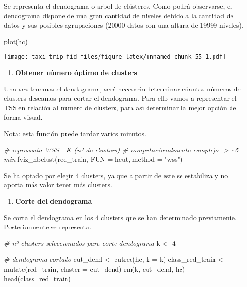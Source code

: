 \documentclass[
]{article}
\newenvironment{Shaded}{\begin{snugshade}}{\end{snugshade}}
\newcommand{\AttributeTok}[1]{\textcolor[rgb]{0.77,0.63,0.00}{#1}}
\newcommand{\CommentTok}[1]{\textcolor[rgb]{0.56,0.35,0.01}{\textit{#1}}}
\newcommand{\DecValTok}[1]{\textcolor[rgb]{0.00,0.00,0.81}{#1}}
\newcommand{\FunctionTok}[1]{\textcolor[rgb]{0.00,0.00,0.00}{#1}}
\newcommand{\NormalTok}[1]{#1}
\newcommand{\OtherTok}[1]{\textcolor[rgb]{0.56,0.35,0.01}{#1}}
\newcommand{\StringTok}[1]{\textcolor[rgb]{0.31,0.60,0.02}{#1}}
\providecommand{\tightlist}{%
  \setlength{\itemsep}{0pt}\setlength{\parskip}{0pt}}
\begin{document}
Se representa el dendograma o árbol de clústeres. Como podrá observarse,
el dendograma dispone de una gran cantidad de niveles debido a la
cantidad de datos y sus posibles agrupaciones (20000 datos con una
altura de 19999 niveles).

\begin{Shaded}
\begin{Highlighting}[]
\FunctionTok{plot}\NormalTok{(hc)}
\end{Highlighting}
\end{Shaded}

\texttt{[image: taxi\_trip\_fid\_files/figure-latex/unnamed-chunk-55-1.pdf]}

\begin{enumerate}
\def\labelenumi{\arabic{enumi}.}
\setcounter{enumi}{3}
\tightlist
\item
  \textbf{Obtener número óptimo de clusters}
\end{enumerate}

Una vez tenemos el dendograma, será necesario determinar cúantos números
de clusters deseamos para cortar el dendograma. Para ello vamos a
representar el TSS en relación al número de clusters, para así
determinar la mejor opción de forma visual.

Nota: esta función puede tardar varios minutos.

\begin{Shaded}
\begin{Highlighting}[]
\CommentTok{\# representa WSS {-} K (nº de clusters)}
\CommentTok{\# computacionalmente complejo {-}\textgreater{} \textasciitilde{}5 min}
\FunctionTok{fviz\_nbclust}\NormalTok{(red\_train, }\AttributeTok{FUN =}\NormalTok{ hcut, }\AttributeTok{method =} \StringTok{"wss"}\NormalTok{)}
\end{Highlighting}
\end{Shaded}

Se ha optado por elegir 4 clusters, ya que a partir de este se
estabiliza y no aporta más valor tener más clusters.

\begin{enumerate}
\def\labelenumi{\arabic{enumi}.}
\setcounter{enumi}{4}
\tightlist
\item
  \textbf{Corte del dendograma}
\end{enumerate}

Se corta el dendograma en los 4 clusters que se han determinado
previamente. Posteriormente se representa.

\begin{Shaded}
\begin{Highlighting}[]
\CommentTok{\# nº clusters seleccionados para corte dendograma}
\NormalTok{k }\OtherTok{\textless{}{-}} \DecValTok{4}

\CommentTok{\# dendograma cortado}
\NormalTok{cut\_dend }\OtherTok{\textless{}{-}} \FunctionTok{cutree}\NormalTok{(hc, }\AttributeTok{k =}\NormalTok{ k)}
\NormalTok{class\_red\_train }\OtherTok{\textless{}{-}} \FunctionTok{mutate}\NormalTok{(red\_train, }\AttributeTok{cluster =}\NormalTok{ cut\_dend)}
\FunctionTok{rm}\NormalTok{(k, cut\_dend, hc)}
\FunctionTok{head}\NormalTok{(class\_red\_train)}
\end{Highlighting}
\end{Shaded}
\end{document}

